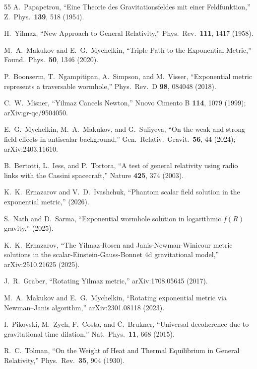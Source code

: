 \documentclass[prl,twocolumn,superscriptaddress,longbibliography,floatfix]{revtex4-2}
\begin{document}
\begin{thebibliography}{55}
A.~Papapetrou,
``Eine Theorie des Gravitationsfeldes mit einer Feldfunktion,''
Z.\ Phys.\ \textbf{139}, 518 (1954).

H.~Yilmaz,
``New Approach to General Relativity,''
Phys.\ Rev.\ \textbf{111}, 1417 (1958).

M.~A.~Makukov and E.~G.~Mychelkin,
``Triple Path to the Exponential Metric,''
Found.\ Phys.\ \textbf{50}, 1346 (2020).

P.~Boonserm, T.~Ngampitipan, A.~Simpson, and M.~Visser,
``Exponential metric represents a traversable wormhole,''
Phys.\ Rev.\ D \textbf{98}, 084048 (2018).

C.~W.~Misner,
``Yilmaz Cancels Newton,''
Nuovo Cimento B \textbf{114}, 1079 (1999);
arXiv:gr-qc/9504050.

E.~G.~Mychelkin, M.~A.~Makukov, and G.~Suliyeva,
``On the weak and strong field effects in antiscalar
background,''
Gen.\ Relativ.\ Gravit.\ \textbf{56}, 44 (2024);
arXiv:2403.11610.

B.~Bertotti, L.~Iess, and P.~Tortora,
``A test of general relativity using radio links with the
Cassini spacecraft,''
Nature \textbf{425}, 374 (2003).

K.~K.~Ernazarov and V.~D.~Ivashchuk,
``Phantom scalar field solution in the exponential metric,''
(2026).

S.~Nath and D.~Sarma,
``Exponential wormhole solution in logarithmic $f(R)$ gravity,''
(2025).

K.~K.~Ernazarov,
``The Yilmaz-Rosen and Janis-Newman-Winicour metric solutions
in the scalar-Einstein-Gauss-Bonnet 4d gravitational model,''
arXiv:2510.21625 (2025).

J.~R.~Graber,
``Rotating Yilmaz metric,''
arXiv:1708.05645 (2017).

M.~A.~Makukov and E.~G.~Mychelkin,
``Rotating exponential metric via Newman--Janis algorithm,''
arXiv:2301.08118 (2023).


I.~Pikovski, M.~Zych, F.~Costa, and \v{C}.~Brukner,
``Universal decoherence due to gravitational time dilation,''
Nat.\ Phys.\ \textbf{11}, 668 (2015).

R.~C.~Tolman,
``On the Weight of Heat and Thermal Equilibrium in General
Relativity,''
Phys.\ Rev.\ \textbf{35}, 904 (1930).


\end{thebibliography}
\end{document}
